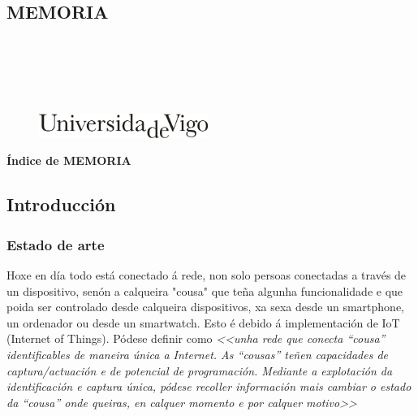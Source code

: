 \documentclass[11pt,twoside]{book}
\begin{document}
\begin{center}
\begin{normalsize}
\begin{center}
\part{\bf{MEMORIA}}
\end{center}
\end{normalsize}
\ \\
\ \\
\ \\
\ \\

\begin{center}
\begin{figure}[htbp]
\begin{center}
\includegraphics[angle=0, height=0.8cm]{images/UVIGOLogo.png}
\end{center}
\end{figure}
\end{center}

\end{center}

\cleardoublepage


\pagestyle{fancy}

\startcontents[parts]
\begin{center}{\large \bf Índice de MEMORIA}\end{center}

{\hypersetup{hidelinks}}

\cleardoublepage%

\chapter{Introducción}

\section{Estado de arte}

Hoxe en día todo está conectado á rede, non solo persoas conectadas a través de un dispositivo, senón a calqueira "cousa" que teña algunha funcionalidade e que poida ser controlado desde calqueira dispositivos, xa sexa desde un smartphone, un ordenador ou desde un smartwatch. Esto é debido á implementación de IoT (Internet of Things). Pódese definir como \textit{<<unha rede que conecta ``cousa'' identificables de maneira única a Internet. As ``cousas'' teñen capacidades de captura/actuación e de potencial de programación. Mediante a explotación  da identificación e captura única, pódese recoller información mais cambiar o estado da ``cousa'' onde queiras, en calquer momento e por calquer motivo>>} \cite{IoT}
\end{document}
